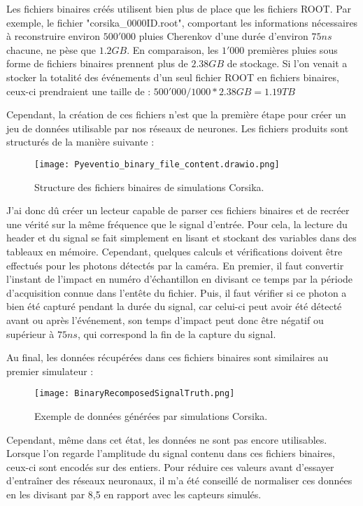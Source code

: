 Les fichiers binaires créés utilisent bien plus de place que les fichiers ROOT. Par exemple, le fichier "corsika\_0000ID.root", comportant les
informations nécessaires à reconstruire environ $500'000$ pluies Cherenkov d'une durée d'environ $75ns$ chacune, ne pèse que $1.2GB$.
En comparaison, les $1'000$ premières pluies sous forme de fichiers binaires prennent plus de $2.38GB$ de stockage. 
Si l'on venait a stocker la totalité des événements d'un seul fichier ROOT en fichiers binaires,
ceux-ci prendraient une taille de : $500'000/1000 * 2.38GB = 1.19TB$

Cependant, la création de ces fichiers n'est que la première étape pour créer un jeu de données utilisable par nos réseaux de neurones.
Les fichiers produits sont structurés de la manière suivante :

\begin{figure}[tbph!]
	\centering
	\texttt{[image: Pyeventio\_binary\_file\_content.drawio.png]}
	\caption[Structure des fichiers binaires de simulations Corsika]{Structure des fichiers binaires de simulations Corsika.}
\end{figure}

J'ai donc dû créer un lecteur capable de parser ces fichiers binaires et de recréer une vérité sur la même fréquence que le signal d'entrée.
Pour cela, la lecture du header et du signal se fait simplement en lisant et stockant des variables dans des tableaux en mémoire.
Cependant, quelques calculs et vérifications doivent être effectués pour les photons détectés par la caméra. 
En premier, il faut convertir l'instant de l'impact en numéro d'échantillon en divisant ce temps par la période d'acquisition connue dans l'entête du fichier.
Puis, il faut vérifier si ce photon a bien été capturé pendant la durée du signal, car celui-ci peut avoir été détecté
avant ou après l'événement, son temps d'impact peut donc être négatif ou supérieur à $75ns$, qui correspond la fin de la capture du signal.

Au final, les données récupérées dans ces fichiers binaires sont similaires au premier simulateur :
\begin{figure}[tbph!]
	\centering
	\texttt{[image: BinaryRecomposedSignalTruth.png]}
	\caption[Exemple de données générées par simulations Corsika]{Exemple de données générées par simulations Corsika.}
\end{figure}

Cependant, même dans cet état, les données ne sont pas encore utilisables. Lorsque l'on regarde l'amplitude 
du signal contenu dans ces fichiers binaires, ceux-ci sont encodés sur des entiers. Pour réduire ces valeurs avant d'essayer
d'entraîner des réseaux neuronaux, il m'a été conseillé de normaliser ces données en les divisant par 8,5 en rapport avec les
capteurs simulés.

